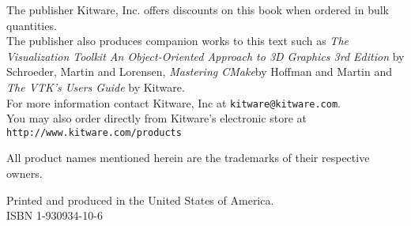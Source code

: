 \begin{minipage}[t][3cm][b]{\textwidth}
\begin{center}
The publisher Kitware, Inc. offers discounts on this book when ordered in bulk quantities.\\
The publisher also produces companion works to this text such as \emph{The Visualization Toolkit An Object-Oriented Approach to 3D Graphics 3rd Edition} by Schroeder, Martin and Lorensen, \emph{Mastering CMake}by Hoffman and Martin and \emph{The VTK's Users Guide} by Kitware.\\
For more information contact Kitware, Inc at \texttt{kitware@kitware.com}.\\
You may also order directly from Kitware's electronic store at \texttt{http://www.kitware.com/products}\\
\end{center}
\end{minipage}


\begin{minipage}[t][3cm][b]{\textwidth}
\begin{center}
All product names mentioned herein are the trademarks of their respective owners.
\end{center}
\end{minipage}


\begin{minipage}[t][3cm][b]{\textwidth}
\begin{center}
Printed and produced in the United States of America.\\
ISBN 1-930934-10-6
\end{center}
\end{minipage}


\newpage
